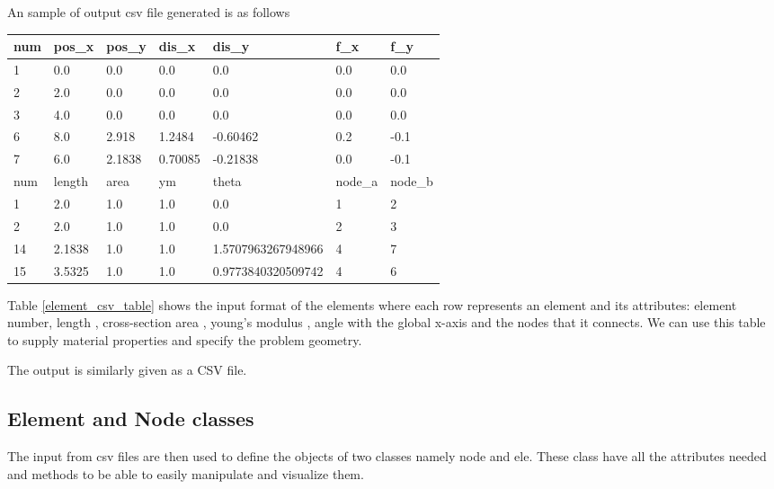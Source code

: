 An sample of output csv file generated is as follows
\begin{table}[]
	\begin{tabular}{|l|l|l|l|l|l|l|}
		\hline
		num & pos\_x & pos\_y & dis\_x             & dis\_y               & f\_x    & f\_y    \\
		\hline
		1   & 0.0    & 0.0    & 0.0                & 0.0                  & 0.0     & 0.0     \\
		2   & 2.0    & 0.0    & 0.0                & 0.0                  & 0.0     & 0.0     \\
		3   & 4.0    & 0.0    & 0.0                & 0.0                  & 0.0     & 0.0\\     
		6   & 8.0    & 2.918  & 1.2484 & -0.60462   & 0.2     & -0.1    \\
		7   & 6.0    & 2.1838 & 0.70085 & -0.21838  & 0.0     & -0.1    \\
		\hline

		num & length & area   & ym                 & theta                & node\_a & node\_b \\
		\hline
	
		1   & 2.0    & 1.0    & 1.0                & 0.0                  & 1       & 2       \\
	
		2   & 2.0    & 1.0    & 1.0                & 0.0                  & 2       & 3       \\

		14  & 2.1838 & 1.0    & 1.0                & 1.5707963267948966   & 4       & 7       \\
		
		15  & 3.5325 & 1.0    & 1.0                & 0.9773840320509742   & 4       & 6 \\ 
		\hline    
	\end{tabular}
\end{table}


Table \ref{element_csv_table} shows the input format of the elements where each row represents an element and its attributes: element number, length , cross-section area , young's modulus , angle with the global x-axis and the nodes that it connects. We can use this table to supply material properties and specify the problem geometry.

The output is similarly given as a CSV file.

\subsection*{Element and Node classes}
The input from csv files are then used to define the objects of two classes namely node and ele. These class have all the attributes needed and methods to be able to easily manipulate and visualize them.

